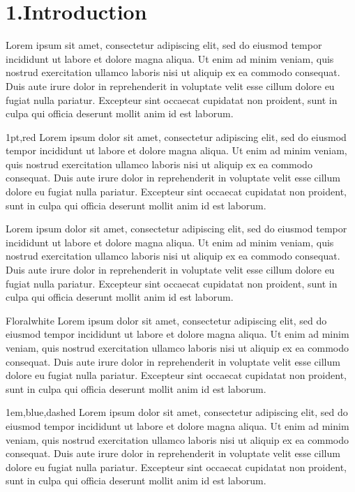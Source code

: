 \documentclass{book}
\newcommand\GFbox{%
  \collectbox*[\color{green}]{\fbox}%
}
\begin{document}
 
\section*{1.\enskip{}Introduction}
 
\GFbox{Lorem ipsum}  sit amet, consectetur adipiscing elit, sed do eiusmod tempor incididunt ut labore et dolore magna aliqua. Ut enim ad minim veniam, quis nostrud exercitation ullamco laboris nisi ut aliquip ex ea commodo consequat. Duis aute irure dolor in reprehenderit in voluptate velit esse cillum dolore eu fugiat nulla pariatur. Excepteur sint occaecat cupidatat non proident, sunt in culpa qui officia deserunt mollit anim id est laborum.

\begin{mdxborder}{1pt,red}%
Lorem ipsum dolor sit amet, consectetur adipiscing elit, sed do eiusmod tempor incididunt ut labore et dolore magna aliqua. Ut enim ad minim veniam, quis nostrud
exercitation ullamco laboris nisi ut aliquip ex ea commodo consequat. Duis aute irure dolor in reprehenderit in voluptate velit esse cillum dolore eu fugiat nulla pariatur. Excepteur sint occaecat cupidatat non proident, sunt in culpa qui officia deserunt mollit anim id est laborum.
\end{mdxborder}%

Lorem ipsum dolor sit amet, consectetur adipiscing elit, sed do eiusmod tempor incididunt ut labore et dolore magna aliqua. Ut enim ad minim veniam, quis nostrud
exercitation ullamco laboris nisi ut aliquip ex ea commodo consequat. Duis aute irure dolor in reprehenderit in voluptate velit esse cillum dolore eu fugiat nulla pariatur. Excepteur sint occaecat cupidatat non proident, sunt in culpa qui officia deserunt mollit anim id est laborum.
 
\begin{mdxbgcolor}{Floralwhite}%
Lorem ipsum dolor sit amet, consectetur adipiscing elit, sed do eiusmod tempor incididunt ut labore et dolore magna aliqua. Ut enim ad minim veniam, quis nostrud
exercitation ullamco laboris nisi ut aliquip ex ea commodo consequat. Duis aute irure dolor in reprehenderit in voluptate velit esse cillum dolore eu fugiat nulla pariatur. Excepteur sint occaecat cupidatat non proident, sunt in culpa qui officia deserunt mollit anim id est laborum.

\begin{mdMarginLR}{1em}{2em}%
\begin{mdxborder}{1em,blue,dashed}
Lorem ipsum dolor sit amet, consectetur adipiscing elit, sed do eiusmod tempor incididunt ut labore et dolore magna aliqua. Ut enim ad minim veniam, quis nostrud
exercitation ullamco laboris nisi ut aliquip ex ea commodo consequat. Duis aute irure dolor in reprehenderit in voluptate velit esse cillum dolore eu fugiat nulla pariatur. Excepteur sint occaecat cupidatat non proident, sunt in culpa qui officia deserunt mollit anim id est laborum.
\end{mdxborder}
\end{mdMarginLR}
\end{mdxbgcolor}
\end{document}
